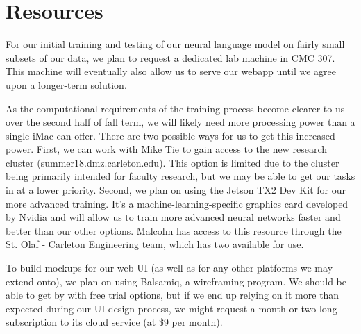 \section{Resources}\label{sec:resources}
For our initial training and testing of our neural language model on fairly small
subsets of our data, we plan to request a dedicated lab machine in CMC 307.
This machine will eventually also allow us to serve our webapp until we agree
upon a longer-term solution.

As the computational requirements of the training process become clearer to us
over the second half of fall term, we will likely need more processing power
than a single iMac can offer.  There are two possible ways for us to get this
increased power. First, we can work with Mike Tie to gain access to the new
research cluster (summer18.dmz.carleton.edu).  This option is limited due to the
cluster being primarily intended for faculty research, but we may be able to get
our tasks in at a lower priority. Second, we plan on using the Jetson TX2 Dev Kit
for our more advanced training. It’s a machine-learning-specific graphics card
developed by Nvidia and will allow us to train more advanced neural networks
faster and better than our other options.  Malcolm has access to this resource
through the St. Olaf - Carleton Engineering team, which has two available for use.

To build mockups for our web UI (as well as for any other platforms we may extend
onto), we plan on using Balsamiq, a wireframing program.  We should be able to
get by with free trial options, but if we end up relying on it more than expected
during our UI design process, we might request a month-or-two-long subscription
to its cloud service (at \$9 per month).
